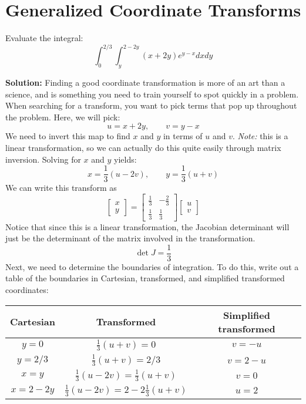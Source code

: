 \documentclass[letterpaper, 11pt]{article}
\begin{document}
\section{Generalized Coordinate Transforms}
Evaluate the integral:
\[ \int_0^{2/3} \int_y^{2 - 2y} (x + 2y)e^{y-x}dx dy \]
\par \textbf{Solution:} Finding a good coordinate transformation is more of an art than a science, and is something you need to train yourself to spot quickly in a problem. When searching for a transform, you want to pick terms that pop up throughout the problem. Here, we will pick:
\[ u = x + 2y, \qquad v = y-x\]
We need to invert this map to find $x$ and $y$ in terms of $u$ and $v$. \textit{Note:} this is a linear transformation, so we can actually do this quite easily through matrix inversion. Solving for $x$ and $y$ yields:
\[x = \frac{1}{3}(u - 2v), \qquad y = \frac{1}{3}(u + v) \]
We can write this transform as
\[ \left[ \begin{array}{c} x \\ y \end{array}\right] = \left[ \begin{array}{cc} \frac{1}{3} & -\frac{2}{3} \\ \frac{1}{3} & \frac{1}{3} \end{array} \right] \left[ \begin{array}{c} u \\ v \end{array}\right] \]
Notice that since this is a linear transformation, the Jacobian determinant will just be the determinant of the matrix involved in the transformation.
\[ \det J = \frac{1}{3} \]
Next, we need to determine the boundaries of integration. To do this, write out a table of the boundaries in Cartesian, transformed, and simplified transformed coordinates:

\begin{center}
\begin{tabular}{|c|c|c|}
\hline Cartesian & Transformed & Simplified transformed\\  \hline
$y = 0$ &  $ \frac{1}{3}(u + v) = 0$ & $v = -u$ \\ \hline
$y = 2/3$ & $\frac{1}{3}(u + v) = 2/3$ & $ v = 2 - u$ \\ \hline
$x = y$ & $\frac{1}{3}(u - 2v) = \frac{1}{3}(u + v)$  & $ v = 0$ \\ \hline
$x = 2 - 2y$ & $\frac{1}{3} (u - 2v) = 2 - 2 \frac{1}{3}(u + v)$ & $u = 2$ \\ \hline
\end{tabular}
\end{center}
\end{document}
